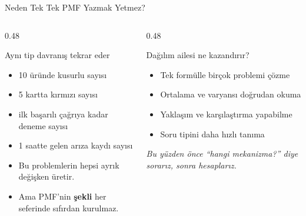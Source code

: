 \documentclass[light]{lutbeamer}
\begin{document}
\begin{frame}{Neden Tek Tek PMF Yazmak Yetmez?}
    \small
    \begin{columns}[T]
        \begin{column}{0.48\textwidth}
            \begin{block}{Aynı tip davranış tekrar eder}
                \begin{itemize}
                    \item 10 üründe kusurlu sayısı
                    \item 5 kartta kırmızı sayısı
                    \item ilk başarılı çağrıya kadar deneme sayısı
                    \item 1 saatte gelen arıza kaydı sayısı
                \end{itemize}
            \end{block}

            \begin{itemize}
                \item Bu problemlerin hepsi ayrık değişken üretir.
                \item Ama PMF'nin \textbf{şekli} her seferinde sıfırdan kurulmaz.
            \end{itemize}
        \end{column}
        \begin{column}{0.48\textwidth}
            \begin{alertblock}{Dağılım ailesi ne kazandırır?}
                \begin{itemize}
                    \item Tek formülle birçok problemi çözme
                    \item Ortalama ve varyansı doğrudan okuma
                    \item Yaklaşım ve karşılaştırma yapabilme
                    \item Soru tipini daha hızlı tanıma
                \end{itemize}
            \end{alertblock}

            \vspace{0.2cm}
            \centering
            \textit{Bu yüzden önce ``hangi mekanizma?'' diye sorarız, sonra hesaplarız.}
        \end{column}
    \end{columns}
\end{frame}
\end{document}

